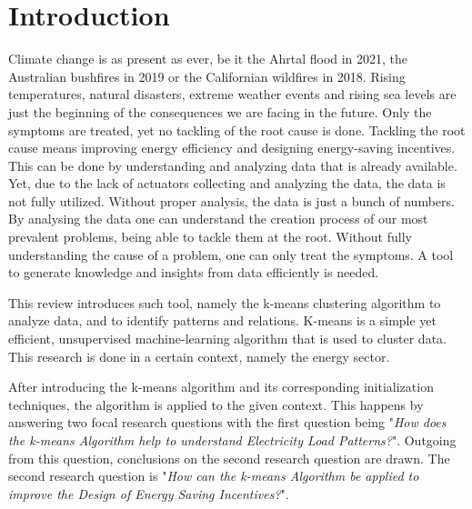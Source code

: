 \section{Introduction}
\label{cha:introduction}


Climate change is as present as ever, be it the Ahrtal flood in 2021, the Australian bushfires in 2019 or the Californian wildfires in 2018.
Rising temperatures, natural disasters, extreme weather events and rising sea levels are just the beginning of the consequences we are facing in the future.
Only the symptoms are treated, yet no tackling of the root cause is done.
Tackling the root cause means improving energy efficiency and designing energy-saving incentives.\\
This can be done by understanding and analyzing data that is already available.
Yet, due to the lack of actuators collecting and analyzing the data, the data is not fully utilized.
Without proper analysis, the data is just a bunch of numbers.
By analysing the data one can understand the creation process of our most prevalent problems, being able to tackle them at the root.
Without fully understanding the cause of a problem, one can only treat the symptoms.
A tool to generate knowledge and insights from data efficiently is needed.

This review introduces such tool, namely the k-means clustering algorithm to analyze data, and to identify patterns and relations.
K-means is a simple yet efficient, unsupervised machine-learning algorithm that is used to cluster data.
This research is done in a certain context, namely the energy sector.

After introducing the k-means algorithm and its corresponding initialization techniques, the algorithm is applied to the given context.
This happens by answering two focal research questions with the first question being "\textit{How does the k-means Algorithm help to understand Electricity Load Patterns?}".
Outgoing from this question, conclusions on the second research question are drawn.
The second research question is "\textit{How can the k-means Algorithm be applied to improve the Design of Energy Saving Incentives?}".


